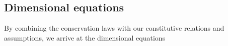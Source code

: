 \subsection{Dimensional equations}
\label{sec:dimensionalmodelequations}

By combining the conservation laws with our constitutive relations
and assumptions, we arrive at the dimensional equations




